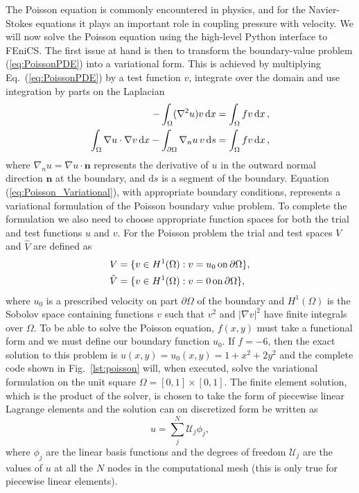 \documentclass[final,3p,times,twocolumn]{elsarticle}
\newcounter{bla}
\begin{document}
The Poisson equation is commonly encountered in physics, and for the Navier-Stokes equations it plays an important role in coupling pressure with velocity. We will now solve the Poisson equation using the high-level Python interface to FEniCS. The first issue at hand is then to transform the boundary-value problem (\ref{eq:PoissonPDE}) into a variational form. This is achieved by multiplying Eq.~(\ref{eq:PoissonPDE}) by a test function $v$, integrate over the domain and use integration by parts on the Laplacian
\begin{align}
 -\int_\Omega (\nabla^2 u)v \, \mathrm{d}x &= \int_\Omega fv \, \mathrm{d}x\thinspace, \\
 \int_\Omega\nabla u\cdot\nabla v \, \mathrm{d}x - \int_{\partial\Omega} \nabla_n u\, v \, \mathrm{d}s   &=  \int_\Omega fv \, \mathrm{d}x\thinspace, \label{eq:Poisson_Variational}
\end{align}
where $\nabla_n u = \nabla u \cdot \bm{n}$ represents the derivative of $u$ in the outward normal direction $\bm{n}$ at the boundary, and $\mathrm{d}s$ is a segment of the boundary. Equation (\ref{eq:Poisson_Variational}), with appropriate boundary conditions, represents a variational formulation of the Poisson boundary value problem. To complete the formulation we also need to choose appropriate function spaces for both the trial and test functions $u$ and $v$. For the Poisson problem the trial and test spaces $V$ and $\hat{V}$ are defined as
\begin{align}
 V &= \{ v\in H^1(\Omega): v=u_0 \,\mathrm{ on }\, \partial \Omega \}, \notag \\
 \hat{V} &= \{ v\in H^1(\Omega): v=0\, \mathrm{ on }\, \partial \Omega \},
 \label{eq:H1-spaces}
\end{align}
where $u_0$ is a prescribed velocity on part $\partial \Omega$ of the boundary and $H^1(\Omega)$ is the Sobolov space containing functions $v$ such that $v^2$ and $|\nabla v|^2$ have finite integrals over $\Omega$. To be able to solve the Poisson equation, $f(x,y)$ must take a functional form and we must define our boundary function $u_0$. If $f = -6$, then the exact solution to this problem is $u(x,y) = u_0(x,y) = 1+x^2+2y^2$ and the complete code shown in Fig.~\ref{lst:poisson} will, when executed, solve the variational formulation on the unit square $\Omega=[0, 1]\times [0,1]$. The finite element solution, which is the product of the solver, is chosen to take the form of piecewise linear Lagrange elements and the solution can on discretized form be written as
\begin{equation}
 u = \sum_j^N \mathcal{U}_j \phi_j,
 \label{eq:u_function}
\end{equation}
where $\phi_j$ are the linear basis functions and the degrees of freedom $\mathcal{U}_j$ are the values of $u$ at all the $N$ nodes in the computational mesh (this is only true for piecewise linear elements). 
\end{document}
